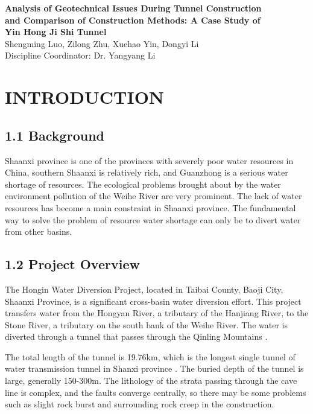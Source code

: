 \documentclass[11pt]{article}
\newcommand{\sectiontitle}[1]{\noindent\textbf{\MakeUppercase{#1}}}
\newcommand{\firstletter}[1]{\textbf{\fontsize{14}{17}\selectfont #1}}
\begin{document}
\begin{center}
{\LARGE \textbf{Analysis of Geotechnical Issues During Tunnel Construction}}\\[2ex]
{\LARGE \textbf{and Comparison of Construction Methods: A Case Study of}}\\[2ex]
{\LARGE \textbf{ Yin Hong Ji Shi Tunnel}}\\[2ex]
{\large Shengming Luo, Zilong Zhu, Xuehao Yin, Dongyi Li}\\[1ex]
{\large Discipline Coordinator: Dr. Yangyang Li}
\end{center}

\section*{\sectiontitle{\firstletter{1} \hspace{0.1cm} \firstletter{I}ntroduction}}

\subsection*{1.1 Background}
Shaanxi province is one of the provinces with severely poor water resources in China, southern Shaanxi is relatively rich, and Guanzhong is a serious water shortage of resources. The ecological problems brought about by the water environment pollution of the Weihe River are very prominent. The lack of water resources has become a main constraint in Shaanxi province. The fundamental way to solve the problem of resource water shortage can only be to divert water from other basins.

\subsection*{1.2 Project Overview}
The Hongin Water Diversion Project, located in Taibai County, Baoji City, Shaanxi Province, is a significant cross-basin water diversion effort. This project transfers water from the Hongyan River, a tributary of the Hanjiang River, to the Stone River, a tributary on the south bank of the Weihe River. The water is diverted through a tunnel that passes through the Qinling Mountains \parencite{bib3}.

The total length of the tunnel is 19.76km, which is the longest single tunnel of water transmission tunnel in Shanxi province \parencite{bib6}. The buried depth of the tunnel is large, generally 150-300m. The lithology of the strata passing through the cave line is complex, and the faults converge centrally, so there may be some problems such as slight rock burst and surrounding rock creep in the construction.
\end{document}
